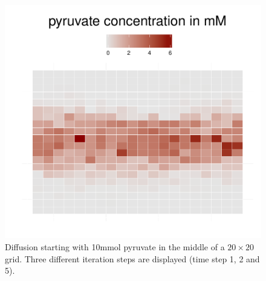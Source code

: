 \begin{figure}[h!]
\begin{minipage}[t]{0.3\textwidth}
  \end{minipage}
  \begin{minipage}[t]{0.3\textwidth}
    \includegraphics[width=\textwidth]{diff5.pdf}
  \end{minipage}
  \caption{Diffusion starting with 10\;mmol pyruvate in the middle of a $20\times20$ grid. Three different iteration steps are displayed (time step 1, 2 and 5).}
  \label{fig:diff}
\end{figure}
